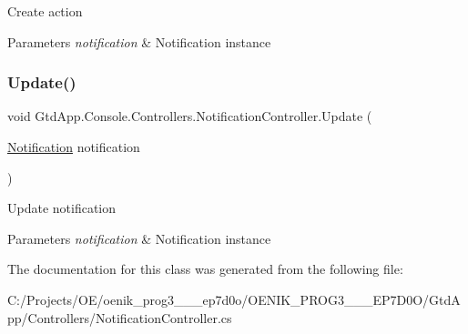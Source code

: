 Create action 


\begin{DoxyParams}{Parameters}
{\em notification} & Notification instance\\
\hline
\end{DoxyParams}
\mbox{\label{class_gtd_app_1_1_console_1_1_controllers_1_1_notification_controller_a39dc538e1e44a9fc9d0ef42d123231c3}} 
\subsubsection{\texorpdfstring{Update()}{Update()}}
{\footnotesize\ttfamily void Gtd\+App.\+Console.\+Controllers.\+Notification\+Controller.\+Update (\begin{DoxyParamCaption}\item[{\mbox{\hyperlink{class_gtd_app_1_1_data_1_1_notification}{Notification}}}]{notification }\end{DoxyParamCaption})}



Update notification 


\begin{DoxyParams}{Parameters}
{\em notification} & Notification instance\\
\hline
\end{DoxyParams}


The documentation for this class was generated from the following file\+:\begin{DoxyCompactItemize}
\item 
C\+:/\+Projects/\+O\+E/oenik\+\_\+prog3\+\_\+\_\+\_\+ep7d0o/\+O\+E\+N\+I\+K\+\_\+\+P\+R\+O\+G3\+\_\+\_\+\_\+\+E\+P7\+D0\+O/\+Gtd\+App/\+Controllers/Notification\+Controller.\+cs\end{DoxyCompactItemize}
